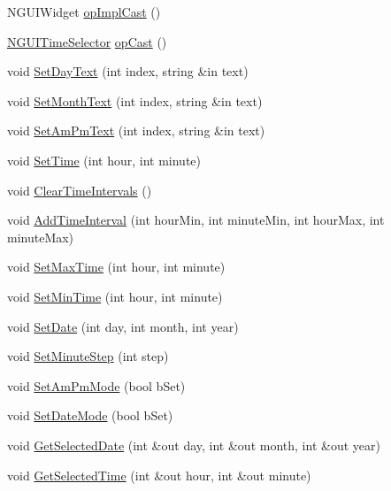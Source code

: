 \begin{DoxyCompactItemize}
N\+G\+U\+I\+Widget \hyperlink{class_n_g_u_i_time_selector_a2a22c415ba23636323f965b788b97e25}{op\+Impl\+Cast} ()
\item 
\hyperlink{class_n_g_u_i_time_selector}{N\+G\+U\+I\+Time\+Selector} \hyperlink{class_n_g_u_i_time_selector_a88de1afccf93160d5d788d4036ab7818}{op\+Cast} ()
\item 
void \hyperlink{class_n_g_u_i_time_selector_ace5542ae59832e3a9173eeed0d53641c}{Set\+Day\+Text} (int index, string \&in text)
\item 
void \hyperlink{class_n_g_u_i_time_selector_a689f085836c87c7ef645125d7094401d}{Set\+Month\+Text} (int index, string \&in text)
\item 
void \hyperlink{class_n_g_u_i_time_selector_a3b09f3cfb9f7348c0b7ce1faf1a03625}{Set\+Am\+Pm\+Text} (int index, string \&in text)
\item 
void \hyperlink{class_n_g_u_i_time_selector_a5864d1d540ed06dcf3acaf31b5ad41dd}{Set\+Time} (int hour, int minute)
\item 
void \hyperlink{class_n_g_u_i_time_selector_a2448b4e04b8ae2471aa864fbaff39e48}{Clear\+Time\+Intervals} ()
\item 
void \hyperlink{class_n_g_u_i_time_selector_aa260e4e5f1de29b13ea74463ac53e222}{Add\+Time\+Interval} (int hour\+Min, int minute\+Min, int hour\+Max, int minute\+Max)
\item 
void \hyperlink{class_n_g_u_i_time_selector_a324991545a666cda79943bd94cde5c78}{Set\+Max\+Time} (int hour, int minute)
\item 
void \hyperlink{class_n_g_u_i_time_selector_ae5ff5790e5cfa3c5fcbeb96b6d6662fa}{Set\+Min\+Time} (int hour, int minute)
\item 
void \hyperlink{class_n_g_u_i_time_selector_a6575cedb24ac12bb0d6ad6ec28938a78}{Set\+Date} (int day, int month, int year)
\item 
void \hyperlink{class_n_g_u_i_time_selector_ae852735618e62beaf0cd1af2a1040976}{Set\+Minute\+Step} (int step)
\item 
void \hyperlink{class_n_g_u_i_time_selector_a52fda150907b8fea959f7746927cd9bc}{Set\+Am\+Pm\+Mode} (bool b\+Set)
\item 
void \hyperlink{class_n_g_u_i_time_selector_ab59537f034d5e6035354fd1ee1cce785}{Set\+Date\+Mode} (bool b\+Set)
\item 
void \hyperlink{class_n_g_u_i_time_selector_ab7113e1c2dd3fac092831e8468c49edd}{Get\+Selected\+Date} (int \&out day, int \&out month, int \&out year)
\item 
void \hyperlink{class_n_g_u_i_time_selector_a29e7dbd4217079b371e8d82bab8c91fd}{Get\+Selected\+Time} (int \&out hour, int \&out minute)

\end{DoxyCompactItemize}
